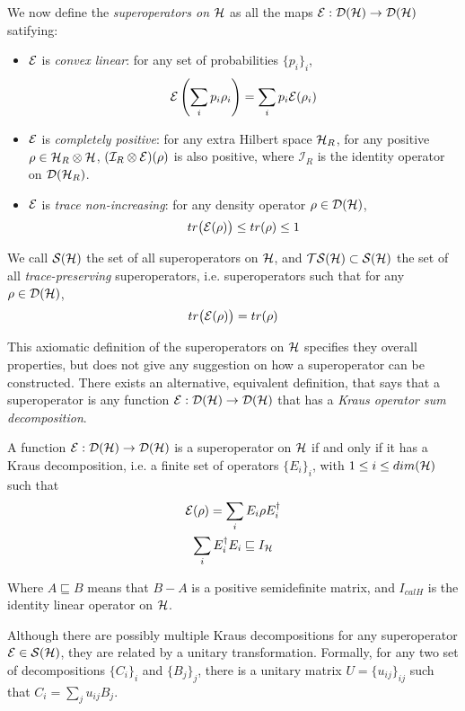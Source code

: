 We now define the \textit{superoperators on $\mathcal{H}$} as all the maps $\mathcal{E}: \mathcal{D}(\mathcal{H}) \rightarrow \mathcal{D}(\mathcal{H})$ satifying:
\begin{itemize}
\item $\mathcal{E}$ is \textit{convex linear}: for any set of probabilities	$\{p_i\}_i$,
\[\mathcal{E}\left(\sum_i p_i \rho_i \right) = \sum_i p_i \mathcal{E}(\rho_i)\]
\item $\mathcal{E}$ is \textit{completely positive}: for any extra Hilbert space $\mathcal{H}_R$, for any positive $\rho \in \mathcal{H}_R \otimes \mathcal{H}$, $(\mathcal{I}_R\otimes \mathcal{E})(\rho)$ is also positive, where $\mathcal{I}_R$ is the identity operator on $\mathcal{D}(\mathcal{H}_R)$.
\item $\mathcal{E}$ is \textit{trace non-increasing}: for any density operator $\rho \in \mathcal{D}(\mathcal{H})$, 
\[tr\big(\mathcal{E}(\rho)\big) \leq tr(\rho) \leq 1\]
\end{itemize}
We call $\mathcal{S}(\mathcal{H})$ the set of all superoperators on $\mathcal{H}$, and $\mathcal{TS}(\mathcal{H}) \subset \mathcal{S}(\mathcal{H})$ the set of all \textit{trace-preserving} superoperators, i.e. superoperators such that for any $\rho \in \mathcal{D}(\mathcal{H})$, 
\[tr\big(\mathcal{E}(\rho)\big) = tr(\rho)\] 



This axiomatic definition of the superoperators on $\mathcal{H}$ specifies they overall properties, but does not give any suggestion on how a superoperator can be constructed. There exists an alternative, equivalent definition, that says that a superoperator is any function $\mathcal{E}: \mathcal{D}(\mathcal{H}) \rightarrow \mathcal{D}(\mathcal{H})$ that has a \textit{Kraus operator sum decomposition}.

A function $\mathcal{E}: \mathcal{D}(\mathcal{H}) \rightarrow \mathcal{D}(\mathcal{H})$ is a superoperator on $\mathcal{H}$ if and only if it has a Kraus decomposition, i.e. a finite set of operators $\{E_i\}_i$, with $1 \leq i \leq dim(\mathcal{H})$ such that
\begin{gather*}
\mathcal{E}(\rho) = \sum_i E_i\rho E_i^\dagger \\
\sum_i E_i^\dagger E_i \sqsubseteq I_{\mathcal{H}}
\end{gather*}

Where $A \sqsubseteq B$ means that $B - A$ is a positive semidefinite matrix, and $I_{calH}$ is the identity linear operator on $\mathcal{H}$.

Although there are possibly multiple Kraus decompositions for any superoperator $\mathcal{E} \in \mathcal{S}(\mathcal{H})$, they are related by a unitary transformation.
Formally, for any two set of decompositions $\{C_i\}_i$ and $\{B_j\}_j$, there is a unitary matrix $U = \{u_{ij}\}_{ij}$ such that $C_i = \sum_j u_{ij} B_j$.

